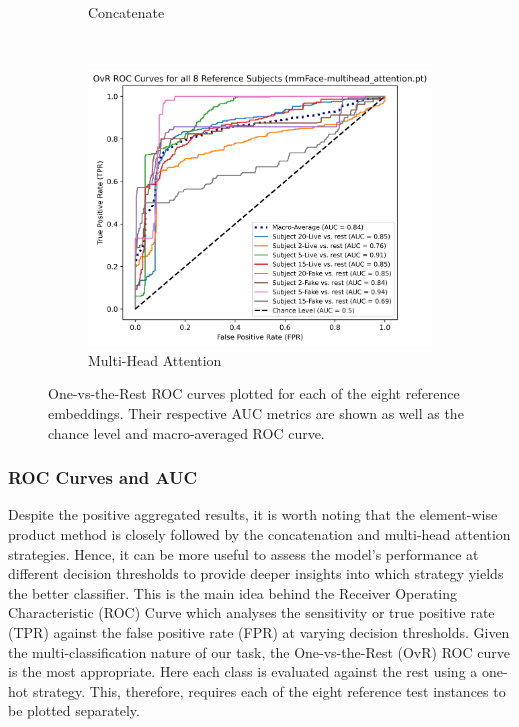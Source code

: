 \documentclass{mpaper}
\begin{document}
\begin{figure}[t!]
\begin{subfigure}[b]{0.315\textwidth}
        \caption{Concatenate}
        \label{fig:roc_concatenate}
    \end{subfigure}
    ~\hspace{0.001cm}
    \begin{subfigure}[b]{0.325\textwidth}
        \includegraphics[width=1.09\textwidth]{figures/roc_multihead_attention.png}
        \caption{Multi-Head Attention}
        \label{fig:roc_multihead_attention}
    \end{subfigure}
    \vspace{0.1cm}
    \caption{One-vs-the-Rest ROC curves plotted for each of the eight reference embeddings. Their respective AUC metrics are shown as well as the chance level and macro-averaged ROC curve.}
    \vspace{-0.35cm}
\end{figure}

\subsubsection{ROC Curves and AUC}
Despite the positive aggregated results, it is worth noting that the element-wise product method is closely followed by the concatenation and multi-head attention strategies. Hence, it can be more useful to assess the model's performance at different decision thresholds to provide deeper insights into which strategy yields the better classifier. This is the main idea behind the Receiver Operating Characteristic (ROC) Curve which analyses the sensitivity or true positive rate (TPR) against the false positive rate (FPR) at varying decision thresholds. Given the multi-classification nature of our task, the One-vs-the-Rest (OvR) ROC curve is the most appropriate. Here each class is evaluated against the rest using a one-hot strategy. This, therefore, requires each of the eight reference test instances to be plotted separately.
\end{document}
